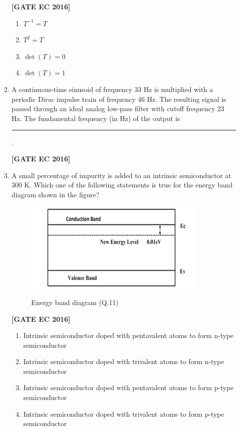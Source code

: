 \documentclass[12pt]{article}
\begin{document}
\begin{enumerate}[label=\textbf{Q.\arabic*.}, start=6, itemsep=2em]
\begin{enumerate}[label=\textbf{Q.\arabic*.}]
\noindent \textbf{[GATE EC 2016]}

\begin{multicols}{2}
\begin{enumerate}[label=\alph*.]
    \item $T^{-1}=T$
    \item $T^2 = T$
    \item \(\det(T)=0\)
    \item \(\det(T)=1\)
\end{enumerate}
\end{multicols}

\item A continuous-time sinusoid of frequency 33 Hz is multiplied with a periodic Dirac impulse train of frequency 46 Hz. The resulting signal is passed through an ideal analog low-pass filter with cutoff frequency 23 Hz. The fundamental frequency (in Hz) of the output is \rule{2.5cm}{0.4pt}.

\noindent \textbf{[GATE EC 2016]}

\item A small percentage of impurity is added to an intrinsic semiconductor at 300 K. Which one of the following statements is true for the energy band diagram shown in the figure?

\begin{figure}[H]\centering
    \includegraphics[width=0.55\columnwidth]{figs/q11.png}
    \caption{Energy band diagram (Q.11)}
    \label{fig:q11}
\end{figure}

\noindent \textbf{[GATE EC 2016]}

\begin{multicols}{2}
\begin{enumerate}[label=\alph*.]
    \item Intrinsic semiconductor doped with pentavalent atoms to form n-type semiconductor
    \item Intrinsic semiconductor doped with trivalent atoms to form n-type semiconductor
    \item Intrinsic semiconductor doped with pentavalent atoms to form p-type semiconductor
    \item Intrinsic semiconductor doped with trivalent atoms to form p-type semiconductor
\end{enumerate}
\end{multicols}


\end{enumerate}
\end{enumerate}
\end{document}
